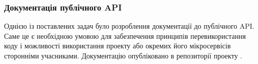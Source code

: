 \subsubsection{Документація публічного API}

Однією із поставлених задач було розроблення документації до публічного API. Саме це є необхідною умовою для забезпечення принципів перевикористання коду і можливості використання проекту або окремих його мікросервісів сторонніми учасниками. Документацію опубліковано в репозиторії проекту \cite{gCalShedule}.

